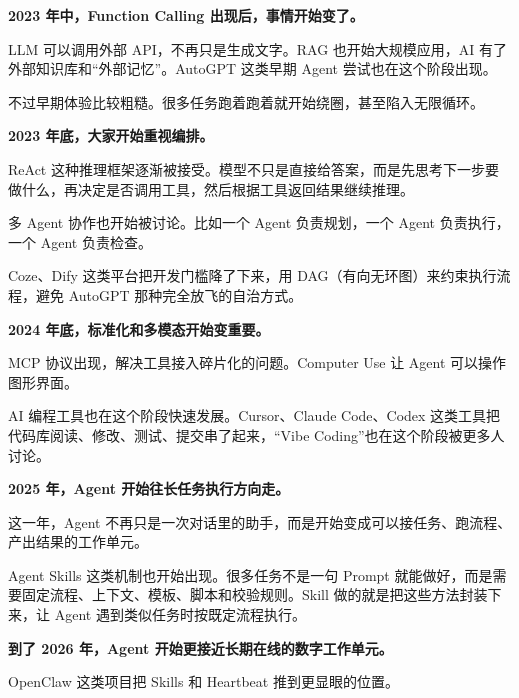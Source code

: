 \documentclass[10pt,a4paper]{ctexart}
\begin{document}
\textbf{2023 年中，Function Calling 出现后，事情开始变了。}



LLM 可以调用外部 API，不再只是生成文字。RAG 也开始大规模应用，AI 有了外部知识库和“外部记忆”。AutoGPT 这类早期 Agent 尝试也在这个阶段出现。



不过早期体验比较粗糙。很多任务跑着跑着就开始绕圈，甚至陷入无限循环。



\textbf{2023 年底，大家开始重视编排。}



ReAct 这种推理框架逐渐被接受。模型不只是直接给答案，而是先思考下一步要做什么，再决定是否调用工具，然后根据工具返回结果继续推理。



多 Agent 协作也开始被讨论。比如一个 Agent 负责规划，一个 Agent 负责执行，一个 Agent 负责检查。



Coze、Dify 这类平台把开发门槛降了下来，用 DAG（有向无环图）来约束执行流程，避免 AutoGPT 那种完全放飞的自治方式。



\textbf{2024 年底，标准化和多模态开始变重要。}



MCP 协议出现，解决工具接入碎片化的问题。Computer Use 让 Agent 可以操作图形界面。



AI 编程工具也在这个阶段快速发展。Cursor、Claude Code、Codex 这类工具把代码库阅读、修改、测试、提交串了起来，“Vibe Coding”也在这个阶段被更多人讨论。



\textbf{2025 年，Agent 开始往长任务执行方向走。}



这一年，Agent 不再只是一次对话里的助手，而是开始变成可以接任务、跑流程、产出结果的工作单元。



Agent Skills 这类机制也开始出现。很多任务不是一句 Prompt 就能做好，而是需要固定流程、上下文、模板、脚本和校验规则。Skill 做的就是把这些方法封装下来，让 Agent 遇到类似任务时按既定流程执行。



\textbf{到了 2026 年，Agent 开始更接近长期在线的数字工作单元。}



OpenClaw 这类项目把 Skills 和 Heartbeat 推到更显眼的位置。
\end{document}
